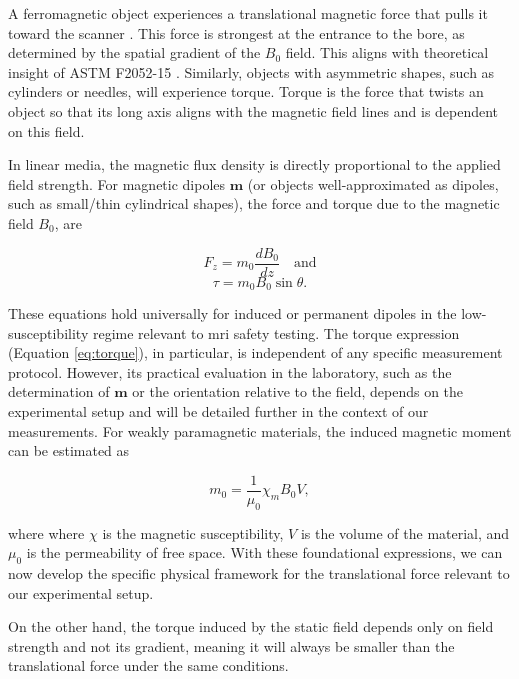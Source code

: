 A ferromagnetic object experiences a translational magnetic force that pulls it toward the scanner \cite{Schenck2000,panych2018}. This force is strongest at the entrance to the bore, as determined by the spatial gradient of the $B_0$ field. This aligns with theoretical insight of ASTM F2052-15 \cite{astmF2052}. Similarly, objects with asymmetric shapes, such as cylinders or needles, will experience torque. Torque is the force that twists an object so that its long axis aligns with the magnetic field lines and is dependent on this field.

In linear media, the magnetic flux density is directly proportional to the applied field strength. For magnetic dipoles $  \boldsymbol{m}  $ (or objects well-approximated as dipoles, such as small/thin cylindrical shapes), the force and torque due to the magnetic field $B_0$, are 

\begin{equation}
F_z = m_0 \frac{dB_0}{dz} \quad \text{and}
	\label{eq:force}
\end{equation}
\begin{equation}
\tau = m _0 B_0 \sin\theta.
	\label{eq:torque}
\end{equation}

\noindent These equations hold universally for induced or permanent dipoles in the low-susceptibility regime relevant to \gls{mri} safety testing. The torque expression (Equation \ref{eq:torque}), in particular, is independent of any specific measurement protocol. However, its practical evaluation in the laboratory, such as the determination of $  \boldsymbol{m}  $ or the orientation relative to the field, depends on the experimental setup and will be detailed further in the context of our measurements.
For weakly paramagnetic materials, the induced magnetic moment can be estimated as

\begin{equation}
	m_0 = \frac{1}{\mu_0} \chi_m B_0 V,
	\label{eq:magnitudemoment}
\end{equation}

\noindent where where $  \chi  $ is the magnetic susceptibility, $  V  $ is the volume of the material, and $  \mu_0  $ is the permeability of free space. With these foundational expressions, we can now develop the specific physical framework for the translational force relevant to our experimental setup.



On the other hand, the torque induced by the static field depends only on field strength and not its gradient, meaning it will always be smaller than the translational force under the same conditions.

